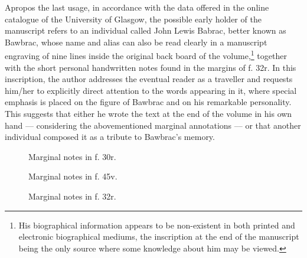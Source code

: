 \begin{paper}
Apropos the last usage, in accordance with the data offered in the
online catalogue of the University of Glasgow, the possible early holder
of the manuscript refers to an individual called John Lewis Babrac,
better known as Bawbrac, whose name and alias can also be read clearly
in a manuscript engraving of nine lines inside the original back board of
the volume,\footnote{His biographical information appears to be
  non-existent in both printed and electronic biographical mediums, the
  inscription at the end of the manuscript being the only source where
  some knowledge about him may be viewed.} together with the short
personal handwritten notes found in the margins of f. 32r. In this
inscription, the author addresses the eventual reader as a traveller and
requests him/her to explicitly direct attention to the words appearing
in it, where special emphasis is placed on the figure of Bawbrac and on
his remarkable personality. This suggests that either he
wrote the text at the end of the volume in his own hand –– considering the abovementioned marginal annotations –– 
or that another individual composed it as a tribute to
Bawbrac's memory.

\begin{figure}[H]
  \centering
    \caption{Marginal notes in f. 30r.}
    \label{fig:lorente47}
    \end{figure}

\begin{figure}[H]
  \centering
    \caption{Marginal notes in f. 45v.}
    \label{fig:lorente48}
    \end{figure}

\begin{figure}[H]
  \centering
    \caption{Marginal notes in f. 32r.}
    \label{fig:lorente49}
    \end{figure}


\end{paper}
